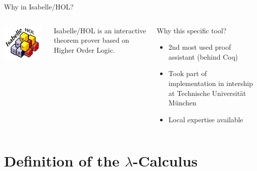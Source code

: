 \documentclass{beamer}
\begin{document}
\begin{frame}{Why in Isabelle/HOL?}
  \begin{columns}[c]
    \includegraphics[scale=0.4]{isabelle_hol.png}
    \begin{definition}
      Isabelle/HOL is an interactive theorem prover based on Higher Order Logic.
    \end{definition}
    \begin{block}{Why this specific tool?}
      \begin{itemize}
        \item 2nd most used proof assistant \small{(behind Coq)}
        \item Took part of implementation in intership at Technische Universität München
        \item Local expertise available
      \end{itemize}
    \end{block}
  \end{columns}
\end{frame}

\section{Definition of the $\lambda$-Calculus}
\end{document}
